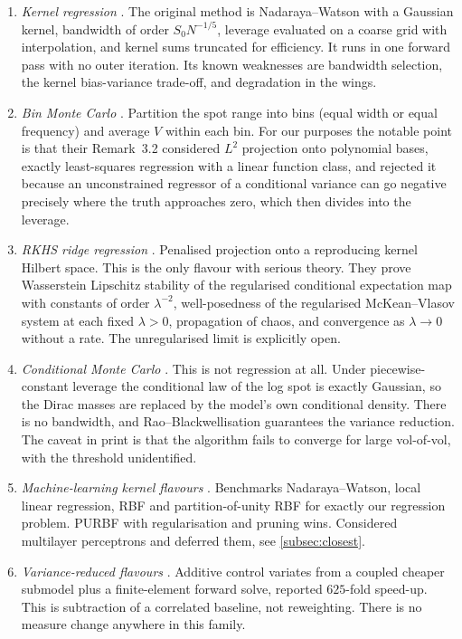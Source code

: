 \documentclass[11pt,a4paper]{article}
\theoremstyle{plain}
\theoremstyle{definition}
\theoremstyle{definition}
\begin{document}
\begin{enumerate}
\item \emph{Kernel regression} \citep{guyon2011smile,guyon2012particular,guyon2013nonlinear}. The original method is Nadaraya--Watson with a Gaussian kernel, bandwidth of order $S_0 N^{-1/5}$, leverage evaluated on a coarse grid with interpolation, and kernel sums truncated for efficiency. It runs in one forward pass with no outer iteration. Its known weaknesses are bandwidth selection, the kernel bias-variance trade-off, and degradation in the wings.
\item \emph{Bin Monte Carlo} \citep{vanderstoep2014}. Partition the spot range into bins (equal width or equal frequency) and average $V$ within each bin. For our purposes the notable point is that their Remark~3.2 considered $L^2$ projection onto polynomial bases, exactly least-squares regression with a linear function class, and rejected it because an unconstrained regressor of a conditional variance can go negative precisely where the truth approaches zero, which then divides into the leverage.
\item \emph{RKHS ridge regression} \citep{bayer2022rkhs}. Penalised projection onto a reproducing kernel Hilbert space. This is the only flavour with serious theory. They prove Wasserstein Lipschitz stability of the regularised conditional expectation map with constants of order $\lambda^{-2}$, well-posedness of the regularised McKean--Vlasov system at each fixed $\lambda > 0$, propagation of chaos, and convergence as $\lambda \to 0$ without a rate. The unregularised limit is explicitly open.
\item \emph{Conditional Monte Carlo} \citep{muguruza2019}. This is not regression at all. Under piecewise-constant leverage the conditional law of the log spot is exactly Gaussian, so the Dirac masses are replaced by the model's own conditional density. There is no bandwidth, and Rao--Blackwellisation guarantees the variance reduction. The caveat in print is that the algorithm fails to converge for large vol-of-vol, with the threshold unidentified.
\item \emph{Machine-learning kernel flavours} \citep{hakala2019}. Benchmarks Nadaraya--Watson, local linear regression, RBF and partition-of-unity RBF for exactly our regression problem. PURBF with regularisation and pruning wins. Considered multilayer perceptrons and deferred them, see \cref{subsec:closest}.
\item \emph{Variance-reduced flavours} \citep{cozma2019}. Additive control variates from a coupled cheaper submodel plus a finite-element forward solve, reported $625$-fold speed-up. This is subtraction of a correlated baseline, not reweighting. There is no measure change anywhere in this family.
\end{enumerate}
\end{document}
